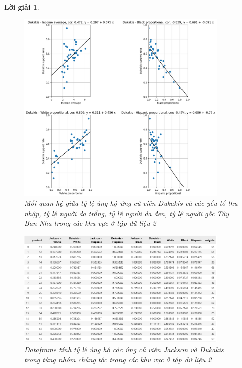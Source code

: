 \documentclass[14pt, a4paper]{article}
\theoremstyle{sltheorem}
\theoremstyle{soltheorem}
\newtheorem*{loigiai}{Lời giải}
\begin{document}
\begin{loigiai}
\begin{enumerate}
    \begin{figure}[H]
        \centering
        \includegraphics[width=0.9\textwidth]{figures/Dukakis_candidate_relationship_factor.png}
        \caption{Mối quan hệ giữa tỷ lệ ủng hộ ứng cử viên Dukakis và các yếu tố thu nhập, tỷ lệ người da trắng, tỷ lệ người da đen, tỷ lệ người gốc Tây Ban Nha trong các khu vực ở tập dữ liệu 2}
        \label{fig:Dukakis_candidate_relationship_factor}
    \end{figure}


    \begin{figure}[H]
        \centering
        \includegraphics[width=0.9\textwidth]{figures/support_rate_df.png}
        \caption{Dataframe tính tỷ lệ ủng hộ các ứng cử viên Jackson và Dukakis trong từng nhóm chủng tộc trong các khu vực ở tập dữ liệu 2}
        \label{fig:support_rate_df}
    \end{figure}


\end{enumerate}
\end{loigiai}
\end{document}
